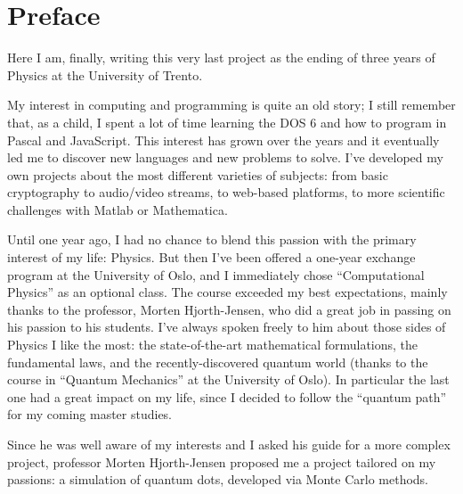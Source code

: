 
\chapter{Preface}

Here I am, finally, writing this very last project as the ending of three years of Physics at the University of Trento.

My interest in computing and programming is quite an old story; I still remember that, as a child, I spent a lot of time learning the DOS 6 and how to program in Pascal and JavaScript. This interest has grown over the years and it eventually led me to discover new languages and new problems to solve. I've developed my own projects about the most different varieties of subjects: from basic cryptography to audio/video streams, to web-based platforms, to more scientific challenges with Matlab or Mathematica.

Until one year ago, I had no chance to blend this passion with the primary interest of my life: Physics. But then I've been offered a one-year exchange program at the University of Oslo, and I immediately chose ``Computational Physics'' as an optional class. The course exceeded my best expectations, mainly thanks to the professor, Morten Hjorth-Jensen, who did a great job in passing on his passion to his students. I've always spoken freely to him about those sides of Physics I like the most: the state-of-the-art mathematical formulations, the fundamental laws, and the recently-discovered quantum world (thanks to the course in ``Quantum Mechanics'' at the University of Oslo). In particular the last one had a great impact on my life, since I decided to follow the ``quantum path'' for my coming master studies.

Since he was well aware of my interests and I asked his guide for a more complex project, professor Morten Hjorth-Jensen proposed me a project tailored on my passions: a simulation of quantum dots, developed via Monte Carlo methods.




